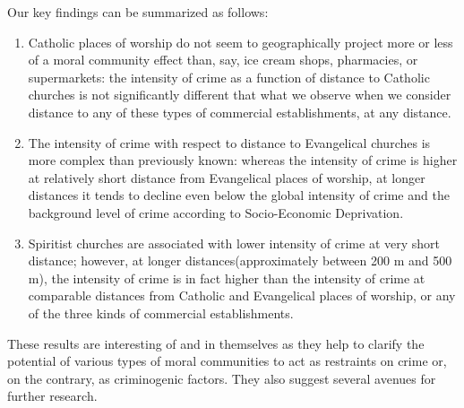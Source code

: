 \documentclass[smallextended]{svjour3}       %
\begin{document}
Our key findings can be summarized as follows:

\begin{enumerate}
\def\labelenumi{\arabic{enumi}.}
\item
  Catholic places of worship do not seem to geographically project more
  or less of a moral community effect than, say, ice cream shops,
  pharmacies, or supermarkets: the intensity of crime as a function of
  distance to Catholic churches is not significantly different that what
  we observe when we consider distance to any of these types of
  commercial establishments, at any distance.
\item
  The intensity of crime with respect to distance to Evangelical
  churches is more complex than previously known: whereas the intensity
  of crime is higher at relatively short distance from Evangelical
  places of worship, at longer distances it tends to decline even below
  the global intensity of crime and the background level of crime
  according to Socio-Economic Deprivation.
\item
  Spiritist churches are associated with lower intensity of crime at
  very short distance; however, at longer distances(approximately
  between 200 m and 500 m), the intensity of crime is in fact higher
  than the intensity of crime at comparable distances from Catholic and
  Evangelical places of worship, or any of the three kinds of commercial
  establishments.
\end{enumerate}

These results are interesting of and in themselves as they help to
clarify the potential of various types of moral communities to act as
restraints on crime or, on the contrary, as criminogenic factors. They
also suggest several avenues for further research.
\end{document}
